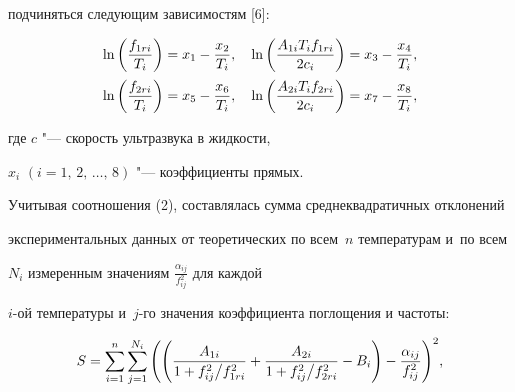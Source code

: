 подчиняться следующим зависимостям [6]:

\begin{equation}

\begin{array}{c}

\displaystyle

\ln \left( {\frac{f_{1ri} }{T_i }} \right)=x_1 -\frac{x_2 }{T_i },

\quad

\ln \left( {\frac{A_{1i} T_i f_{1ri} }{2  c_i }} 

\right)=x_3 -\frac{x_4 }{T_i },\vspace{2mm}\\

\displaystyle

\ln \left( {\frac{f_{2ri} }{T_i }} \right)=x_5 -\frac{x_6 }{T_i },

\quad

\ln \left( {\frac{A_{2i} T_i f_{2ri} }{2 c_i }} 

\right)=x_7 -\frac{x_8 }{T_i },

\end{array}

\end{equation}

где $c$ "--- скорость ультразвука в жидкости,

$x_{i}$ $(i=1,\,2,\,\dots,\,8)$ "--- коэффициенты прямых.



Учитывая соотношения (2), составлялась сумма среднеквадратичных отклонений 

экспериментальных данных от теоретических по всем~$n$ температурам и~по всем 

$N_{i}$ измеренным значениям $\frac{\alpha_{ij}}{f_{ij}^2 }$ для каждой 

$i$-ой температуры и~$j$-го значения коэффициента поглощения и частоты:



\begin{equation}

S=\sum\limits_{i=1}^n {\sum\limits_{j=1}^{N_i } {\left( {\left( 

{\frac{A_{1i} }{1+{f_{ij}^2 } \mathord{\left/ {\vphantom {{f_{ij}^2 } 

{f_{1ri}^2 }}} \right. \kern-\nulldelimiterspace} {f_{1ri}^2 }}+\frac{A_{2i} 

}{1+{f_{ij}^2 } \mathord{\left/ {\vphantom {{f_{ij}^2 } {f_{2ri}^2 }}} 

\right. \kern-\nulldelimiterspace} {f_{2ri}^2 }}-B_i } \right)-\frac{\alpha 

_{ij} }{f_{ij} ^2}} \right)^2} } ,

\end{equation}


